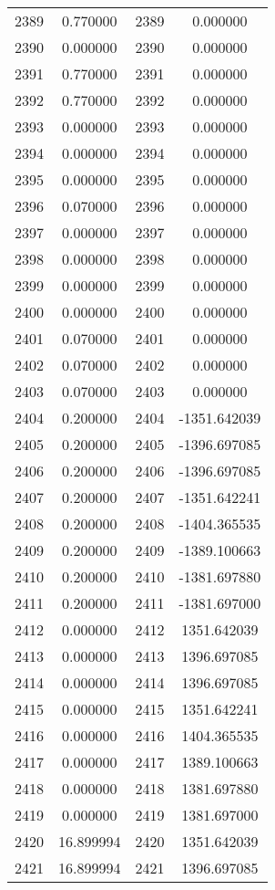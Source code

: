 \documentclass[12pt]{article}
\begin{document}
\begin{longtable}{@{}cccc@{}}
2389 & 0.770000 & 2389 & 0.000000 \\
2390 & 0.000000 & 2390 & 0.000000 \\
2391 & 0.770000 & 2391 & 0.000000 \\
2392 & 0.770000 & 2392 & 0.000000 \\
2393 & 0.000000 & 2393 & 0.000000 \\
2394 & 0.000000 & 2394 & 0.000000 \\
2395 & 0.000000 & 2395 & 0.000000 \\
2396 & 0.070000 & 2396 & 0.000000 \\
2397 & 0.000000 & 2397 & 0.000000 \\
2398 & 0.000000 & 2398 & 0.000000 \\
2399 & 0.000000 & 2399 & 0.000000 \\
2400 & 0.000000 & 2400 & 0.000000 \\
2401 & 0.070000 & 2401 & 0.000000 \\
2402 & 0.070000 & 2402 & 0.000000 \\
2403 & 0.070000 & 2403 & 0.000000 \\
2404 & 0.200000 & 2404 & -1351.642039 \\
2405 & 0.200000 & 2405 & -1396.697085 \\
2406 & 0.200000 & 2406 & -1396.697085 \\
2407 & 0.200000 & 2407 & -1351.642241 \\
2408 & 0.200000 & 2408 & -1404.365535 \\
2409 & 0.200000 & 2409 & -1389.100663 \\
2410 & 0.200000 & 2410 & -1381.697880 \\
2411 & 0.200000 & 2411 & -1381.697000 \\
2412 & 0.000000 & 2412 & 1351.642039 \\
2413 & 0.000000 & 2413 & 1396.697085 \\
2414 & 0.000000 & 2414 & 1396.697085 \\
2415 & 0.000000 & 2415 & 1351.642241 \\
2416 & 0.000000 & 2416 & 1404.365535 \\
2417 & 0.000000 & 2417 & 1389.100663 \\
2418 & 0.000000 & 2418 & 1381.697880 \\
2419 & 0.000000 & 2419 & 1381.697000 \\
2420 & 16.899994 & 2420 & 1351.642039 \\
2421 & 16.899994 & 2421 & 1396.697085 \\

\end{longtable}
\end{document}
